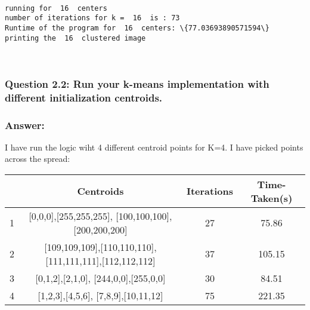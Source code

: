 \documentclass[11pt]{article}
\begin{document}
    \begin{center}
    \end{center}
    { \hspace*{\fill} \\}
    
    \begin{Verbatim}[commandchars=\\\{\}]
running for  16  centers
number of iterations for k =  16  is : 73
Runtime of the program for  16  centers: \{77.03693890571594\}
printing the  16  clustered image
    \end{Verbatim}

    \begin{center}
    \end{center}
    { \hspace*{\fill} \\}
    
    \hypertarget{question-2.2-run-your-k-means-implementation-with-different-initialization-centroids.}{%
\subsubsection{Question 2.2: Run your k-means implementation with
different initialization
centroids.}\label{question-2.2-run-your-k-means-implementation-with-different-initialization-centroids.}}

\hypertarget{answer}{%
\subsubsection{Answer:}\label{answer}}

I have run the logic wiht 4 different centroid points for K=4. I have
picked points across the spread:

\begin{longtable}[]{@{}cccc@{}}
\toprule
& Centroids & Iterations & Time-Taken(s) \\
\midrule
\endhead
1 & {[}0,0,0{]},{[}255,255,255{]}, {[}100,100,100{]},{[}200,200,200{]} &
27 & 75.86 \\
2 & {[}109,109,109{]},{[}110,110,110{]},
{[}111,111,111{]},{[}112,112,112{]} & 37 & 105.15 \\
3 & {[}0,1,2{]},{[}2,1,0{]}, {[}244,0,0{]},{[}255,0,0{]} & 30 & 84.51 \\
4 & {[}1,2,3{]},{[}4,5,6{]}, {[}7,8,9{]},{[}10,11,12{]} & 75 & 221.35 \\
\bottomrule
\end{longtable}
\end{document}
